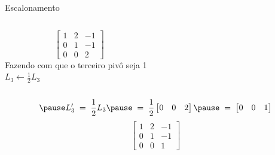 \begin{resolution}{Escalonamento}
\begin{columns}
  \[\;\;\;
  \begin{bmatrix}
    1 & 2 & -1 \\
    0 & 1 & -1 \\
    0 & 0 & 2
  \end{bmatrix}
  \]
  \pause
{}
  Fazendo com que o terceiro pivô seja 1
  \\ \pause
  \(
    L_3 \leftarrow \frac{1}{2} L_3
  \)
\end{columns}
\vspace{-\baselineskip}
\[
  \pause
  L'_3
  \;=\;
  \frac{1}{2} L_3
  \pause
  \;=\;
  \frac{1}{2}
  \begin{bmatrix}
    0 & 0 & 2
  \end{bmatrix}
  \pause
  \;=\;
  \begin{bmatrix}
    0 & 0 & 1
  \end{bmatrix}
\]
\pause
\[
  \begin{bmatrix}
    1 & 2 & -1 \\
    0 & 1 & -1 \\
    0 & 0 & 1
  \end{bmatrix}
\]
\end{resolution}


